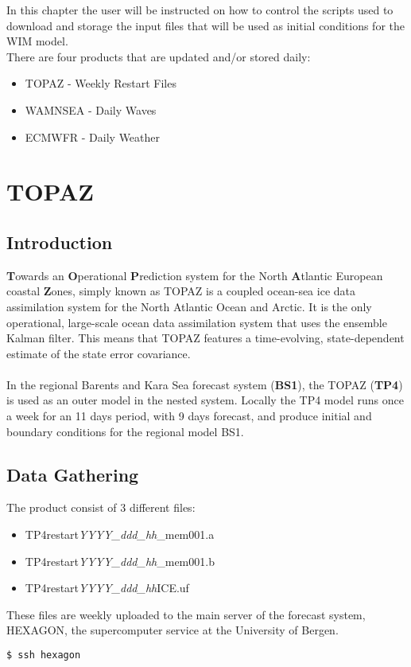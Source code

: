 
In this chapter the user will be instructed on how to control the scripts used to download and storage the input files that will be used as initial conditions for the WIM model.\\
There are four products that are updated and/or stored daily:
\begin{itemize}
\item TOPAZ - Weekly Restart Files
\item WAMNSEA - Daily Waves 
\item ECMWFR - Daily Weather
\end{itemize}

\section{TOPAZ}
\subsection{Introduction}
\textbf{T}owards an \textbf{O}perational \textbf{P}rediction system for the North \textbf{A}tlantic European coastal \textbf{Z}ones, simply known as TOPAZ is a coupled ocean-sea ice data assimilation system for the North Atlantic Ocean and Arctic. It is the only operational, large-scale ocean data assimilation system that uses the ensemble Kalman filter. This means that TOPAZ features a time-evolving, state-dependent estimate of the state error covariance. \\ \\
In the regional Barents and Kara Sea forecast system (\textbf{BS1}), the TOPAZ (\textbf{TP4}) is used as an outer model in the nested system. Locally the TP4 model runs once a week for an 11 days period, with 9 days forecast, and produce initial and boundary conditions for the regional model BS1.
\subsection{Data Gathering}
The product consist of 3 different files:
\begin{itemize}
\item TP4restart\textit{YYYY\_ddd\_hh}\_mem001.a
\item TP4restart\textit{YYYY\_ddd\_hh}\_mem001.b
\item TP4restart\textit{YYYY\_ddd\_hh}ICE.uf
\end{itemize}
These files are weekly uploaded to the main server of the forecast system, HEXAGON, the supercomputer service at the University of Bergen.
\begin{lstlisting}[language=bash]
$ ssh hexagon
\end{lstlisting}